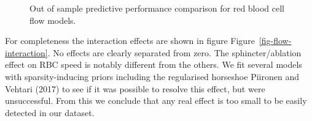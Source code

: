 \documentclass[
  letterpaper,
  DIV=11,
  numbers=noendperiod,
  oneside]{scrartcl}
\theoremstyle{plain}
\theoremstyle{remark}
\begin{document}
\begin{figure}


\caption{\label{fig-flow-loo}Out of sample predictive performance
comparison for red blood cell flow models.}

\end{figure}%

For completeness the interaction effects are shown in figure
Figure~\ref{fig-flow-interaction}. No effects are clearly separated from
zero. The sphincter/ablation effect on RBC speed is notably different
from the others. We fit several models with sparsity-inducing priors
including the regularised horseshoe Piironen and Vehtari (2017) to see
if it was possible to resolve this effect, but were unsuccessful. From
this we conclude that any real effect is too small to be easily detected
in our dataset.
\end{document}
